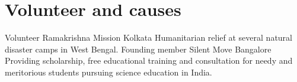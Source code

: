 \section{Volunteer and causes}
        {Volunteer}
        {Ramakrishna Mission}
        {Kolkata}
        {}
        {Humanitarian relief at several natural disaster camps in West Bengal.}
        {Founding member}
        {Silent Move}
        {Bangalore}
        {}
        {Providing scholarship, free educational training and consultation
         for needy and meritorious students pursuing science education in India.}
